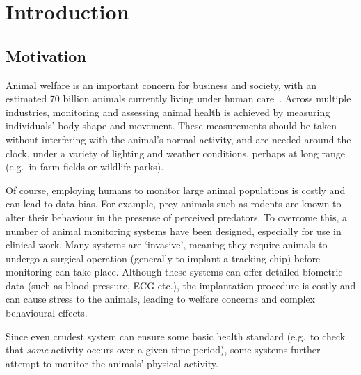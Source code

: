 
\chapter{Introduction}\label{chap:intro}  %

\ifpdf
    \graphicspath{{Chapter1/Figs/Raster/}{Chapter1/Figs/PDF/}{Chapter1/Figs/}}
\else
    \graphicspath{{Chapter1/Figs/Vector/}{Chapter1/Figs/}}
\fi


\section{Motivation} %

Animal welfare is an important concern for business and society, with an estimated 70 billion animals currently living under human care~\cite{FAOSTAT}. Across multiple industries, monitoring and assessing animal health is achieved by measuring individuals' body shape and movement. These measurements should be taken without interfering with the animal's normal activity, and are needed around the clock, under a variety of lighting and weather conditions, perhaps at long range (e.g.\ in farm fields or wildlife parks). 

Of course, employing humans to monitor large animal populations is costly and can lead to data bias. For example, prey animals such as rodents are known to alter their behaviour in the presense of perceived predators. To overcome this, a number of animal monitoring systems have been designed, especially for use in clinical work. Many systems are `invasive', meaning they require animals to undergo a surgical operation (generally to implant a tracking chip) before monitoring can take place. Although these systems can offer detailed biometric data (such as blood pressure, ECG etc.), the implantation procedure is costly and can cause stress to the animals, leading to welfare concerns and complex behavioural effects. 

Since even crudest system can ensure some basic health standard (e.g.\ to check that \emph{some} activity occurs over a given time period), some systems further attempt to monitor the animals' physical activity. 

